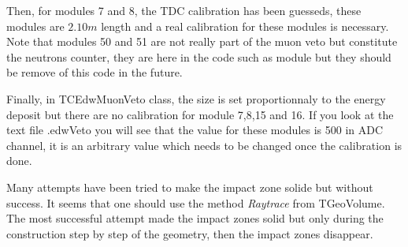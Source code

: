 \documentclass[12pt, a4paper]{article}
\begin{document}
Then, for modules 7 and 8, the TDC calibration has been guesseds, these modules are $ 2.10 m $ length and a real calibration for these modules is necessary. Note that modules 50 and 51 are not really part of the muon veto but constitute the neutrons counter, they are here in the code such as module but they should be remove of this code in the future. 

Finally, in TCEdwMuonVeto class, the size is set proportionnaly to the energy deposit but there are no calibration for module 7,8,15 and 16. If you look at the text file .edwVeto you will see that the value for these modules is 500 in ADC channel, it is an arbitrary value which needs to be changed once the calibration is done. 

Many attempts have been tried to make the impact zone solide but without success. It seems that one should use the method \emph{Raytrace} from TGeoVolume. The most successful attempt made the impact zones solid but only during the construction step by step of the geometry, then the impact zones disappear. 
\end{document}
